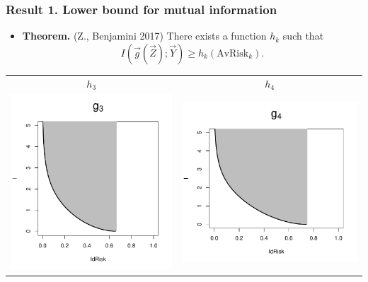 \documentclass{beamer}
\begin{document}
\begin{frame}
\frametitle{Result 1. Lower bound for mutual information}
\begin{itemize}
\item \textbf{Theorem.} (Z., Benjamini 2017) There exists a function $h_k$ such that
\[I(\vec{g}(\vec{Z}); \vec{Y}) \geq h_k(\text{AvRisk}_k).\]
\end{itemize}
\begin{center}
\begin{tabular}{cc}
$h_3$ & $h_4$\\
\includegraphics[scale = 0.4, clip=true, trim=0 0 0 0.55in]{../idloss/g3.pdf} &
\includegraphics[scale = 0.4, clip=true, trim=0 0 0 0.55in]{../idloss/g4.pdf}
\end{tabular}
\end{center}
\end{frame}
\end{document}
